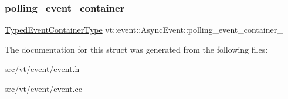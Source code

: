 \mbox{\label{structvt_1_1event_1_1_async_event_aa622d9e34d70a6de6ca74b16e65c1bae}} 
\subsubsection{\texorpdfstring{polling\+\_\+event\+\_\+container\+\_\+}{polling\_event\_container\_}}
{\footnotesize\ttfamily \hyperlink{structvt_1_1event_1_1_async_event_af0397f32fb9d7dd136c544737eeb7796}{Typed\+Event\+Container\+Type} vt\+::event\+::\+Async\+Event\+::polling\+\_\+event\+\_\+container\+\_\+\hspace{0.3cm}{\ttfamily [private]}}



The documentation for this struct was generated from the following files\+:\begin{DoxyCompactItemize}
\item 
src/vt/event/\hyperlink{event_8h}{event.\+h}\item 
src/vt/event/\hyperlink{event_8cc}{event.\+cc}\end{DoxyCompactItemize}
